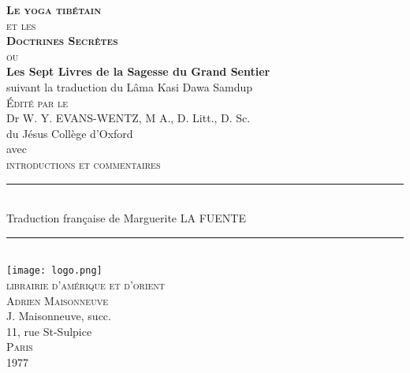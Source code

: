 \documentclass[10pt]{book}
\begin{document}
\newcommand{\samadhi}{Samādhi}
\newcommand{\nirvana}{Nirvāṇa}
\newcommand{\prajnaparamita}{Prajñāpāramitā}
\newcommand{\kaya}{Kāya}
\newcommand{\atman}{ātman}
\newcommand{\samsara}{Saṃsāra}

\begin{center}
\pagecolor{orange}
\huge\textbf{\textsc{Le yoga tibétain}}\\\vspace{1mm}
\small\textsc{et les}\\\vspace{1mm}
\huge\textbf{\textsc{Doctrines Secrêtes}}\\\vspace{3mm}
\small\textsc{ou}\\\vspace{3mm}
\large\textbf{Les Sept Livres de la Sagesse du Grand Sentier}\\\vspace{3mm}
\tiny{suivant la traduction du Lâma Kasi Dawa Samdup}\\
\vspace{0.7cm}
\textsc{Édité par le}\\\vspace{3mm}
\small{Dr W. Y. EVANS-WENTZ, M A., D. Litt., D. Sc.}\\\vspace{1mm}
\tiny{du Jésus Collège d'Oxford}\\\vspace{1cm}
\tiny{avec}\\
\small\textsc{introductions et commentaires}\\\vspace{4mm}
\rule{1.2cm}{0.2mm}\\\vspace{5mm}
\small{Traduction française de Marguerite LA FUENTE}\\\vspace{0.5cm}
\rule{1.2cm}{0.2mm}\\\vspace{5mm}
\texttt{[image: logo.png]}\\\vspace{5mm}
\textsc{librairie d'amérique et d'orient}\\
\textsc{Adrien Maisonneuve}\\
\small J. Maisonneuve,  \tiny succ.\\
\tiny 11, rue St-Sulpice\\
\textsc{Paris}\\
\textsc{1977}\\
\end{center}
\end{document}

